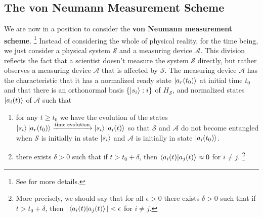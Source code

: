 \documentclass[letter, 12pt]{turabian-thesis}
\theoremstyle{hypothesis}
\let\origfootnote\footnote %
\renewcommand{\footnote}[1]{%
\noindent %
\origfootnote{#1}}
\begin{document}
\subsection{The von Neumann Measurement Scheme}\label{vonNeumannMeasurement}
\addtocounter{footnote}{-1}
\addtocounter{footnote}{1}

We are now in a position to consider the \textbf{von Neumann measurement scheme}.\footnote{See \cite[50-53]{Schlosshauer} for more details.} Instead of considering the whole of physical reality, for the time being, we just consider a physical system $\mathcal{S}$ and a measuring device $\mathcal{A}$. This division reflects the fact that a scientist doesn't measure the system $\mathcal{S}$ directly, but rather observes a measuring device $\mathcal{A}$ that is affected by $\mathcal{S}$. The measuring device $\mathcal{A}$ has the characteristic that it has a normalized ready state $\ket{a_r(t_0)}$ at initial time $t_0$ and that there is an orthonormal basis $\{\ket{s_i}:i\}$ of $H_\mathcal{S}$, and normalized states $\ket{a_i(t)}$ of $\mathcal{A}$ such that
\begin{enumerate}[noitemsep, nosep, topsep=0pt] 
\item for any $t\geq t_0$ we have the evolution of the states \label{vonNeumannMeasurement1}
$\ket{s_i}\ket{a_r(t_0)}\xrightarrow{\text{time evolution}}\ket{s_i}\ket{a_i(t)}$ so that $\mathcal{S}$ and $\mathcal{A}$ do not become entangled when $\mathcal{S}$ is initially in state $\ket{s_i}$ and $\mathcal{A}$ is initially in state $\ket{a_i(t_0)}$.
\item there exists $\delta>0$ such that if $t> t_0+\delta$, then $\ip{a_i(t)}{a_j(t)}\approx 0$ for $i\neq j$.\footnote{\label{approx}More precisely, we should say that for all $\epsilon >0$ there exists $\delta>0$ such that if $t> t_0+\delta$, then $|\ip{a_i(t)}{a_j(t)}|<\epsilon$ for $i\neq j$.}
\end{enumerate}
\end{document}
